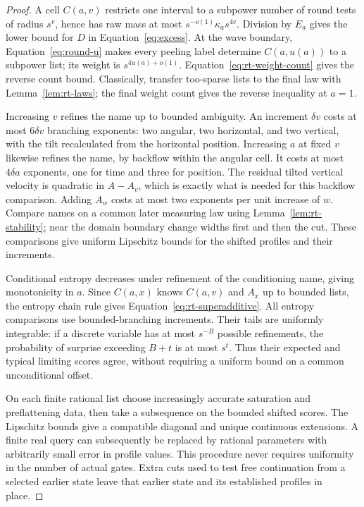 \begin{proof}
A cell $C(a,v)$ restricts one interval to a subpower number of
round tests of radius $s^v$, hence has raw mass at most
$s^{-o(1)}\kappa_as^{4v}$.  Division by $E_a$ gives the lower
bound for $D$ in Equation~\eqref{eq:excess}.  At the wave boundary,
Equation~\eqref{eq:round-u} makes every peeling label determine
$C(a,u(a))$ to a subpower list; its weight is
$s^{4u(a)+o(1)}$.  Equation~\eqref{eq:rt-weight-count} gives the
reverse count bound.  Classically, transfer too-sparse lists to the
final law with Lemma~\ref{lem:rt-laws}; the final weight count gives
the reverse inequality at $a=1$.

Increasing $v$ refines the name up to bounded ambiguity.  An
increment $\delta v$ costs at most $6\delta v$ branching
exponents: two angular, two horizontal, and two vertical, with the
tilt recalculated from the horizontal position.  Increasing $a$
at fixed $v$ likewise refines the name, by backflow within the
angular cell.  It costs at most $4\delta a$ exponents, one for
time and three for position.  The residual tilted vertical velocity
is quadratic in $A-A_v$, which is exactly what is needed for this
backflow comparison.  Adding $A_w$ costs at most two exponents per
unit increase of $w$.  Compare names on a common later measuring
law using Lemma~\ref{lem:rt-stability}; near the domain boundary
change widths first and then the cut.  These comparisons give
uniform Lipschitz bounds for the shifted profiles and their
increments.

Conditional entropy decreases under refinement of the conditioning
name, giving monotonicity in $a$.  Since $C(a,x)$ knows
$C(a,v)$ and $A_x$ up to bounded lists, the entropy chain rule gives
Equation~\eqref{eq:rt-superadditive}.  All entropy comparisons use
bounded-branching increments.  Their tails are uniformly integrable:
if a discrete variable has at most $s^{-B}$ possible refinements,
the probability of surprise exceeding $B+t$ is at most $s^t$.
Thus their expected and typical limiting scores agree, without
requiring a uniform bound on a common unconditional offset.

On each finite rational list choose increasingly accurate
saturation and preflattening data, then take a subsequence on the
bounded shifted scores.  The Lipschitz bounds give a compatible
diagonal and unique continuous extensions.  A finite real query can
subsequently be replaced by rational parameters with arbitrarily
small error in profile values.  This procedure never requires
uniformity in the number of actual gates.  Extra cuts used to test
free continuation from a selected earlier state leave that earlier
state and its established profiles in place.
\end{proof}

